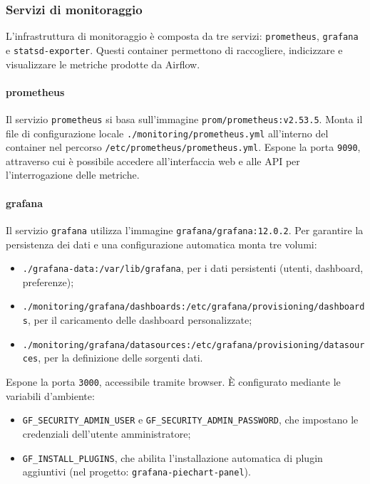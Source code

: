 \subsubsection{Servizi di monitoraggio}

L’infrastruttura di monitoraggio è composta da tre servizi: \texttt{prometheus}, \texttt{grafana} e \texttt{statsd-exporter}.  
Questi container permettono di raccogliere, indicizzare e visualizzare le metriche prodotte da Airflow.

\paragraph{prometheus}
Il servizio \texttt{prometheus} si basa sull’immagine \texttt{prom/prometheus:v2.53.5}.  
Monta il file di configurazione locale \texttt{./monitoring/prometheus.yml} all’interno del container nel percorso \texttt{/etc/prometheus/prometheus.yml}.  
Espone la porta \texttt{9090}, attraverso cui è possibile accedere all’interfaccia web e alle API per l’interrogazione delle metriche.

\paragraph{grafana}
Il servizio \texttt{grafana} utilizza l’immagine \texttt{grafana/grafana:12.0.2}.  
Per garantire la persistenza dei dati e una configurazione automatica monta tre volumi:  
\begin{itemize}
    \item \texttt{./grafana-data:/var/lib/grafana}, per i dati persistenti (utenti, dashboard, preferenze);
    \item \texttt{./monitoring/grafana/dashboards:/etc/grafana/provisioning/dashboards}, per il caricamento delle dashboard personalizzate;
    \item \texttt{./monitoring/grafana/datasources:/etc/grafana/provisioning/datasources}, per la definizione delle sorgenti dati.
\end{itemize}
Espone la porta \texttt{3000}, accessibile tramite browser.  
È configurato mediante le variabili d’ambiente:  
\begin{itemize}
    \item \texttt{GF\_SECURITY\_ADMIN\_USER} e \texttt{GF\_SECURITY\_ADMIN\_PASSWORD}, che impostano le credenziali dell’utente amministratore;
    \item \texttt{GF\_INSTALL\_PLUGINS}, che abilita l’installazione automatica di plugin aggiuntivi (nel progetto: \texttt{grafana-piechart-panel}).
\end{itemize}

